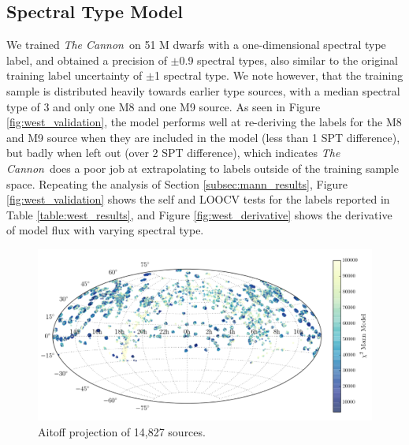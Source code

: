 \documentclass[twocolumn]{aastex62}
\newcommand{\thecannon}{\textsl{The Cannon}}
\begin{document}
\subsection{Spectral Type Model \label{subsec:west_results}}

We trained \thecannon\ on 51 M dwarfs with a one-dimensional spectral type label, and obtained a precision of $\pm$0.9 spectral types, also similar to the original training label uncertainty of $\pm$1 spectral type. We note however, that the training sample is distributed heavily towards earlier type sources, with a median spectral type of 3 and only one M8 and one M9 source. As seen in Figure \ref{fig:west_validation}, the model performs well at re-deriving the labels for the M8 and M9 source when they are included in the model (less than 1 SPT difference), but badly when left out (over 2 SPT difference), which indicates \thecannon\ does a poor job at extrapolating to labels outside of the training sample space. Repeating the analysis of Section \ref{subsec:mann_results}, Figure \ref{fig:west_validation} shows the self and LOOCV tests for the labels reported in Table \ref{table:west_results}, and Figure \ref{fig:west_derivative} shows the derivative of model flux with varying spectral type.


\begin{figure}
	\includegraphics[width=\linewidth]{figures/aitoff.png}
	\caption{Aitoff projection of 14,827 sources.}
	\label{fig:aitoff}
\end{figure}
\end{document}
